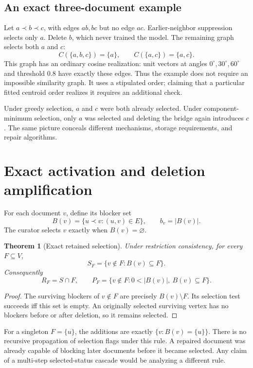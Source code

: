 \documentclass[11pt,a4paper]{article}
\newtheorem{theorem}{Theorem}[section]
\theoremstyle{definition}\newtheorem{definition}[theorem]{Definition}
\newcommand{\minus}{\setminus}
\begin{document}
\subsection{An exact three-document example}
Let $a\prec b\prec c$, with edges $ab,bc$ but no edge $ac$. Earlier-neighbor suppression selects only $a$. Delete $b$, which never trained the model. The remaining graph selects both $a$ and $c$:
\[
 C(\{a,b,c\})=\{a\},\qquad C(\{a,c\})=\{a,c\}.
\]
This graph has an ordinary cosine realization: unit vectors at angles $0^\circ,30^\circ,60^\circ$ and threshold $0.8$ have exactly these edges. Thus the example does not require an impossible similarity graph. It uses a stipulated order; claiming that a particular fitted centroid order realizes it requires an additional check.

Under greedy selection, $a$ and $c$ were both already selected. Under component-minimum selection, only $a$ was selected and deleting the bridge again introduces $c$. The same picture conceals different mechanisms, storage requirements, and repair algorithms.

\section{Exact activation and deletion amplification}
For each document $v$, define its blocker set
\[
 B(v)=\{u\prec v:(u,v)\in E\},\qquad b_v=|B(v)|.
\]
The curator selects $v$ exactly when $B(v)=\varnothing$.

\begin{theorem}[Exact retained selection]\label{thm:activation}
Under restriction consistency, for every $F\subseteq V$,
\begin{equation}\label{eq:activation}
 S_F=\{v\notin F:B(v)\subseteq F\}.
\end{equation}
Consequently
\[
 R_F=S\cap F,\qquad
 P_F=\{v\notin F:0<|B(v)|,\ B(v)\subseteq F\}.
\]
\end{theorem}
\begin{proof}
The surviving blockers of $v\notin F$ are precisely $B(v)\minus F$. Its selection test succeeds iff this set is empty. An originally selected surviving vertex has no blockers before or after deletion, so it remains selected.
\end{proof}

For a singleton $F=\{u\}$, the additions are exactly $\{v:B(v)=\{u\}\}$. There is no recursive propagation of selection flags under this rule. A repaired document was already capable of blocking later documents before it became selected. Any claim of a multi-step selected-status cascade would be analyzing a different rule.
\end{document}
